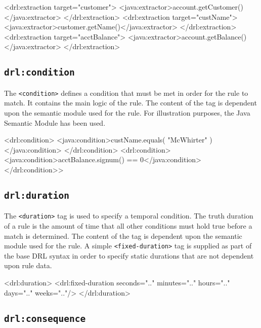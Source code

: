 \begin{codelisting}
<drl:extraction target="customer">
\textcolor{light}{  <java:extractor>account.getCustomer()</java:extractor>}
</drl:extraction>
<drl:extraction target="custName">
\textcolor{light}{  <java:extractor>customer.getName()</java:extractor>} 
</drl:extraction>
<drl:extraction target="acctBalance">
\textcolor{light}{  <java:extractor>account.getBalance()</java:extractor>}
</drl:extraction>
\end{codelisting}

\subsection{\texttt{drl:condition}}

The \verb|<condition>| defines a condition that must be met in
order for the rule to match. It contains the main logic of the rule.
The content of the tag is dependent upon the semantic module used for the rule.
For illustration purposes, the Java Semantic Module has been used.

\begin{codelisting}
<drl:condition>
\textcolor{light}{  <java:condition>custName.equals( "McWhirter" )</java:condition>}
</drl:condition>
<drl:condition>
\textcolor{light}{  <java:condition>acctBalance.signum() == 0</java:condition>}
</drl:condition>>
\end{codelisting}

\subsection{\texttt{drl:duration}}

The \verb|<duration>| tag is used to specify a temporal condition.
The truth duration of a rule is the amount of time that all other
conditions must hold true before a match is determined.  The
content of the tag is dependent upon the semantic module used
for the rule. A simple \verb|<fixed-duration>| tag is supplied as
part of the base DRL syntax in order to specify static durations
that are not dependent upon rule data.

\begin{codelisting}
<drl:duration>
  <drl:fixed-duration seconds=".."
                      minutes=".."
                      hours=".."
                      days=".."
                      weeks=".."/>
</drl:duration>
\end{codelisting}

\subsection{\texttt{drl:consequence}}


